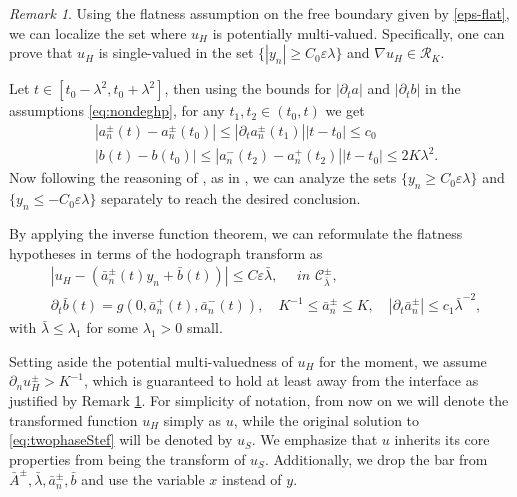 \documentclass[12pt]{article}
\newcommand{\nor}[1]{\left\lvert#1\right\rvert}
\numberwithin{Theorem}{section}
\theoremstyle{definition}
\theoremstyle{remark}
\newtheorem{Remark}[Theorem]{Remark}
\numberwithin{equation}{section}
\newcommand{\p}{\partial}
\begin{document}
    
\begin{Remark}
    \label{Rmk:flat}
    Using the flatness assumption on the free boundary given by \eqref{eps-flat}, we can localize the set where $u_H$ is potentially multi-valued.  Specifically, one can  prove that $u_H$ is single-valued in the set $\{|y_n| \geq C_0\varepsilon\lambda\}$ and $\nabla u_H \in \mathcal{R}_{K}$.  
    
    Let $t\in [t_0-\lambda^2,t_0+\lambda^2]$, then using the bounds for $|{\p_t}a|$ and $|{\p_t}b|$ in the assumptions \ref{eq:nondeghp}, for any $t_1, t_2 \in (t_0,t)$ we get
    \begin{equation*}
        \begin{aligned}
            &\nor{a_{n}^\pm(t)-a_{n}^\pm(t_0)} \leq \nor{{\p_t}a_{n}^\pm(t_1)} \nor{t-t_0} \leq c_0  \\
            &\nor{b(t)-b(t_0)} \leq \nor{a_n^-(t_2) -a_{n}^+(t_2)} \nor{t-t_0}  \leq 2K\lambda^{2}.
        \end{aligned}
    \end{equation*}
Now following the reasoning of \cite{DFS23}, as in \cite[Remark 3.3]{ferrari2026free},  we can analyze the sets $\{y_n \geq C_0 \varepsilon \lambda\}$ and $\{y_n \leq -C_0 \varepsilon \lambda\}$ separately to reach the desired conclusion.

By applying the inverse function theorem, we can reformulate the flatness hypotheses in terms of the hodograph transform as
 \begin{align*}
        &\nor{u_H - (\bar a_n^\pm (t)y_n+\bar b(t))} \leq C\varepsilon \bar \lambda,\quad   \textit{ in } \mathcal{C}^\pm_{\bar \lambda},  \\
        &{\p_t} \bar b(t)=g(0, \bar a_n^+(t),  \bar a_n^-(t)), \quad  K^{-1} \leq \bar a_n^\pm \leq K, \quad \nor{ {\p_t} \bar a_n^\pm} \leq c_1 \bar \lambda^{-2},
    \end{align*}
    with $\bar \lambda\leq \lambda_1$ for some $ \lambda_1>0$ small. 
\end{Remark}


Setting aside the potential multi-valuedness of $u_H$ for the moment, we assume $\partial_{n}u_H^\pm > K^{-1}$, which is guaranteed to hold at least away from the interface as justified by Remark \ref{Rmk:flat}.
For simplicity of notation, from now on we will denote the transformed function $u_H$ simply as $u$, while the original solution to \eqref{eq:twophaseStef} will be denoted by $u_S$. We emphasize that $u$ inherits its core properties from being the transform of $u_S$. Additionally, we drop the bar from $\bar A^{\pm}, \bar \lambda, \bar a_{n}^\pm, \bar b$ and use the variable $x$ instead of $y$.
\end{document}
